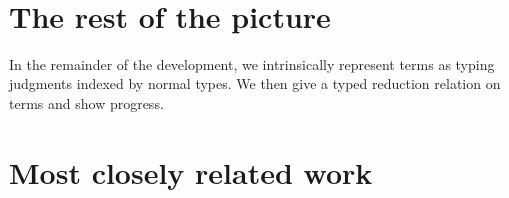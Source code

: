 \documentclass[authoryear, acmsmall, screen, review, nonacm]{acmart} %
\begin{document}
\begin{code}
\>[0]\AgdaSpace{}%
\AgdaSymbol{\{}\AgdaSpace{}%
\AgdaSymbol{=}\AgdaSpace{}%
\AgdaSymbol{\}}\AgdaSpace{}%
\AgdaSymbol{\{}\AgdaSymbol{\}}\AgdaSpace{}%
\AgdaSpace{}%
\AgdaSymbol{=}\AgdaSpace{}%
\AgdaSpace{}%
\AgdaSymbol{(}\AgdaSpace{}%
\AgdaSymbol{)}\<%
\\
%
\\[\AgdaEmptyExtraSkip]%
\>[0]\AgdaComment{--------------------------------------------------------------------------------}\<%
\\
\>[0]\<%
\\
%
\\[\AgdaEmptyExtraSkip]%
\>[0]\AgdaSpace{}%
\AgdaSymbol{:}\AgdaSpace{}%
\AgdaSpace{}%
\AgdaSymbol{\{}\AgdaSpace{}%
\AgdaSymbol{\}}\AgdaSpace{}%
\AgdaSpace{}%
\AgdaSymbol{(}\AgdaSpace{}%
\AgdaSpace{}%
\AgdaSymbol{:}\AgdaSpace{}%
\AgdaSpace{}%
\AgdaSpace{}%
\AgdaSymbol{)}\AgdaSpace{}%
\AgdaSpace{}%
\AgdaSpace{}%
\AgdaSpace{}%
\AgdaSpace{}%
\AgdaSpace{}%
\AgdaSpace{}%
\AgdaSpace{}%
\AgdaSpace{}%
\AgdaSpace{}%
\<%
\\
\>[0]\AgdaSpace{}%
\AgdaSpace{}%
\AgdaSpace{}%
\AgdaSpace{}%
\AgdaSymbol{=}\AgdaSpace{}%
\AgdaSpace{}%
\AgdaSymbol{(}\AgdaSpace{}%
\AgdaSymbol{)}\AgdaSpace{}%
\AgdaSymbol{(}\AgdaSpace{}%
\AgdaSymbol{)}\<%
\end{code}

\section{The rest of the picture}

In the remainder of the development, we intrinsically represent terms as typing judgments indexed by normal types. We then give a typed reduction relation on terms and show progress.

\section{Most closely related work}
\subsubsection{\citet{ChapmanKNW19}}
\subsubsection{\citet{AllaisBM13}}




\end{document}

